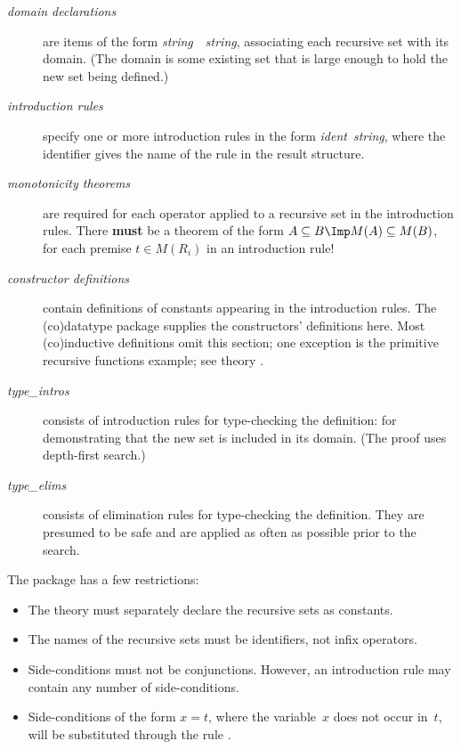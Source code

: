 \begin{description}
\item[\it domain declarations] are items of the form
  {\it string\/}~\isa{\isasymsubseteq }~{\it string}, associating each recursive set with
  its domain.  (The domain is some existing set that is large enough to
  hold the new set being defined.)

\item[\it introduction rules] specify one or more introduction rules in
  the form {\it ident\/}~{\it string}, where the identifier gives the name of
  the rule in the result structure.

\item[\it monotonicity theorems] are required for each operator applied to
  a recursive set in the introduction rules.  There \textbf{must} be a theorem
  of the form $A\subseteq B\Imp M(A)\subseteq M(B)$, for each premise $t\in M(R_i)$
  in an introduction rule!

\item[\it constructor definitions] contain definitions of constants
  appearing in the introduction rules.  The (co)datatype package supplies
  the constructors' definitions here.  Most (co)inductive definitions omit
  this section; one exception is the primitive recursive functions example;
  see theory .
  
\item[\it type\_intros] consists of introduction rules for type-checking the
  definition: for demonstrating that the new set is included in its domain.
  (The proof uses depth-first search.)

\item[\it type\_elims] consists of elimination rules for type-checking the
  definition.  They are presumed to be safe and are applied as often as
  possible prior to the  search.
\end{description}

The package has a few restrictions:
\begin{itemize}
\item The theory must separately declare the recursive sets as
  constants.

\item The names of the recursive sets must be identifiers, not infix
operators.  

\item Side-conditions must not be conjunctions.  However, an introduction rule
may contain any number of side-conditions.

\item Side-conditions of the form $x=t$, where the variable~$x$ does not
  occur in~$t$, will be substituted through the rule .
\end{itemize}


